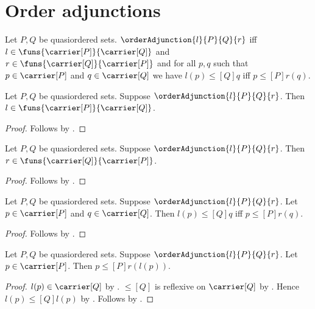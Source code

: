 \section{Order adjunctions}



\begin{definition}\label{order_adjunction}
    Let $P,Q$ be quasiordered sets.
    $\orderAdjunction{l}{P}{Q}{r}$ iff
        $l\in\funs{\carrier[P]}{\carrier[Q]}$ and
        $r\in\funs{\carrier[Q]}{\carrier[P]}$ and
        for all $p,q$ such that $p\in\carrier[P]$ and
            $q\in\carrier[Q]$ we have
            $l(p)\mathrel{\leq[Q]}q$ iff
            $p\mathrel{\leq[P]}r(q)$.
\end{definition}

\begin{proposition}\label{order_adjunction_left_type}
    Let $P,Q$ be quasiordered sets.
    Suppose $\orderAdjunction{l}{P}{Q}{r}$.
    Then $l\in\funs{\carrier[P]}{\carrier[Q]}$.
\end{proposition}
\begin{proof}
    Follows by .
\end{proof}

\begin{proposition}\label{order_adjunction_right_type}
    Let $P,Q$ be quasiordered sets.
    Suppose $\orderAdjunction{l}{P}{Q}{r}$.
    Then $r\in\funs{\carrier[Q]}{\carrier[P]}$.
\end{proposition}
\begin{proof}
    Follows by .
\end{proof}

\begin{proposition}\label{order_adjunction_iff}
    Let $P,Q$ be quasiordered sets.
    Suppose $\orderAdjunction{l}{P}{Q}{r}$.
    Let $p\in\carrier[P]$ and $q\in\carrier[Q]$.
    Then $l(p)\mathrel{\leq[Q]}q$ iff
        $p\mathrel{\leq[P]}r(q)$.
\end{proposition}
\begin{proof}
    Follows by .
\end{proof}

\begin{proposition}\label{order_adjunction_unit}
    Let $P,Q$ be quasiordered sets.
    Suppose $\orderAdjunction{l}{P}{Q}{r}$.
    Let $p\in\carrier[P]$.
    Then $p\mathrel{\leq[P]}r(l(p))$.
\end{proposition}
\begin{proof}
    $l(p)\in\carrier[Q]$ by
        .
    $\leq[Q]$ is reflexive on $\carrier[Q]$ by
        .
    Hence $l(p)\mathrel{\leq[Q]}l(p)$ by .
    Follows by .
\end{proof}

